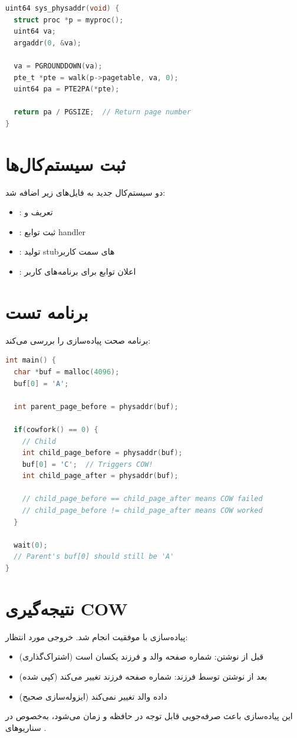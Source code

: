 \documentclass[12pt,a4paper]{article}
\begin{document}
\begin{latin}
\begin{lstlisting}[language=C, caption={سیستم‌کال physaddr}]
uint64 sys_physaddr(void) {
  struct proc *p = myproc();
  uint64 va;
  argaddr(0, &va);
  
  va = PGROUNDDOWN(va);
  pte_t *pte = walk(p->pagetable, va, 0);
  uint64 pa = PTE2PA(*pte);
  
  return pa / PGSIZE;  // Return page number
}
\end{lstlisting}
\end{latin}

\section{ثبت سیستم‌کال‌ها}
دو سیستم‌کال جدید به فایل‌های زیر اضافه شد:
\begin{itemize}
    \item {}: تعریف  و 
    \item {}: ثبت توابع handler
    \item {}: تولید stub‌های سمت کاربر
    \item {}: اعلان توابع برای برنامه‌های کاربر
\end{itemize}

\section{برنامه تست}
برنامه  صحت پیاده‌سازی را بررسی می‌کند:

\begin{latin}
\begin{lstlisting}[language=C, caption={برنامه تست COW}]
int main() {
  char *buf = malloc(4096);
  buf[0] = 'A';
  
  int parent_page_before = physaddr(buf);
  
  if(cowfork() == 0) {
    // Child
    int child_page_before = physaddr(buf);
    buf[0] = 'C';  // Triggers COW!
    int child_page_after = physaddr(buf);
    
    // child_page_before == child_page_after means COW failed
    // child_page_before != child_page_after means COW worked
  }
  
  wait(0);
  // Parent's buf[0] should still be 'A'
}
\end{lstlisting}
\end{latin}

\section{نتیجه‌گیری COW}
پیاده‌سازی  با موفقیت انجام شد. خروجی مورد انتظار:
\begin{itemize}
    \item قبل از نوشتن: شماره صفحه والد و فرزند یکسان است (اشتراک‌گذاری)
    \item بعد از نوشتن توسط فرزند: شماره صفحه فرزند تغییر می‌کند (کپی شده)
    \item داده والد تغییر نمی‌کند (ایزوله‌سازی صحیح)
\end{itemize}

این پیاده‌سازی باعث صرفه‌جویی قابل توجه در حافظه و زمان می‌شود، به‌خصوص در سناریوهای .
\end{document}
